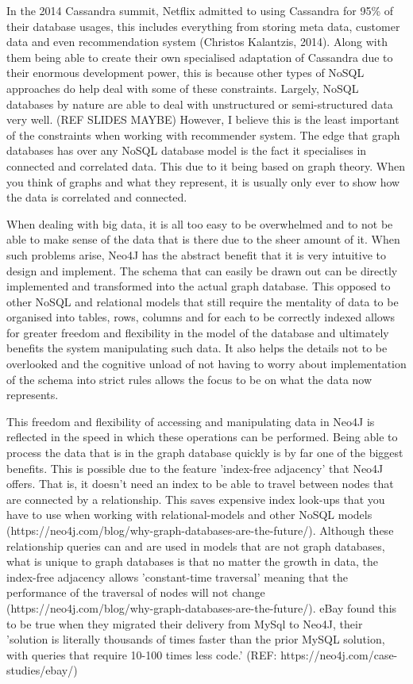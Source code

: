 \documentclass[a4paper]{article}
\begin{document}
In the 2014 Cassandra summit, Netflix admitted to using Cassandra for 95\% of their database usages, this includes everything from storing meta data, customer data and even recommendation system (Christos Kalantzis, 2014). Along with them being able to create their own specialised adaptation of Cassandra due to their enormous development power, this is because other types of NoSQL approaches do help deal with some of these constraints. Largely, NoSQL databases by nature are able to deal with unstructured or semi-structured data very well. (REF SLIDES MAYBE) However, I believe this is the least important of the constraints when working with recommender system. The edge that graph databases has over any NoSQL database model is the fact it specialises in connected and correlated data. This due to it being based on graph theory. When you think of graphs and what they represent, it is usually only ever to show how the data is correlated and connected. \par

When dealing with big data, it is all too easy to be overwhelmed and to not be able to make sense of the data that is there due to the sheer amount of it. When such problems arise, Neo4J has the abstract benefit that it is very intuitive to design and implement. The schema that can easily be drawn out can be directly implemented and transformed into the actual graph database. This opposed to other NoSQL and relational models that still require the mentality of data to be organised into tables, rows, columns and for each to be correctly indexed allows for greater freedom and flexibility in the model of the database and ultimately benefits the system manipulating such data. It also helps the details not to be overlooked and the cognitive unload of not having to worry about implementation of the schema into strict rules allows the focus to be on what the data now represents.\par

This freedom and flexibility of accessing and manipulating data in Neo4J is reflected in the speed in which these operations can be performed. Being able to process the data that is in the graph database quickly is by far one of the biggest benefits. This is possible due to the feature 'index-free adjacency' that Neo4J offers. That is, it doesn't need an index to be able to travel between nodes that are connected by a relationship. This saves expensive index look-ups that you have to use when working with relational-models and other NoSQL models (https://neo4j.com/blog/why-graph-databases-are-the-future/). Although these relationship queries can and are used in models that are not graph databases, what is unique to graph databases is that no matter the growth in data, the index-free adjacency allows 'constant-time traversal' meaning that the performance of the traversal of nodes will not change (https://neo4j.com/blog/why-graph-databases-are-the-future/). eBay found this to be true when they migrated their delivery from MySql to Neo4J, their 'solution is literally thousands of times faster than the prior MySQL solution, with queries that require 10-100 times less code.' (REF: https://neo4j.com/case-studies/ebay/) \par
\end{document}
